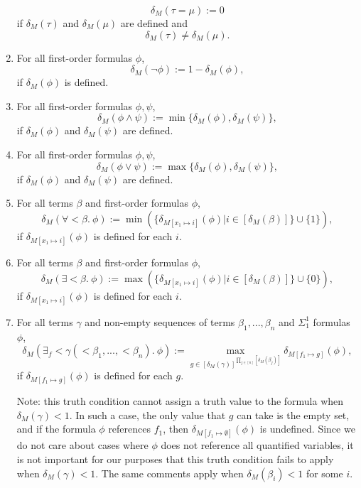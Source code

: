 \documentclass[11pt]{article}
\begin{document}
\begin{enumerate}
		\begin{equation}
			\delta_M(\tau = \mu) := 0
		\end{equation}
		if $\delta_M(\tau)$ and $\delta_M(\mu)$ are defined and 
		\begin{equation}
			\delta_M(\tau) \neq \delta_M(\mu).
		\end{equation}
	\item For all first-order formulas $\phi$,
		\begin{equation}
			\delta_M(\neg\phi) := 1 - \delta_M(\phi),
		\end{equation}
		if $\delta_M(\phi)$ is defined.
	\item For all first-order formulas $\phi, \psi$,
		\begin{equation}
			\delta_M(\phi \wedge \psi) := \min\{\delta_M(\phi), \delta_M(\psi)\},
		\end{equation}
		if $\delta_M(\phi)$ and $\delta_M(\psi)$ are defined.
	\item For all first-order formulas $\phi, \psi$,
		\begin{equation}
			\delta_M(\phi \vee \psi) := \max\{\delta_M(\phi), \delta_M(\psi)\},
		\end{equation}
		if $\delta_M(\phi)$ and $\delta_M(\psi)$ are defined.
	\item For all terms $\beta$ and first-order formulas $\phi$,
		\begin{equation}
			\delta_M(\forall < \beta.\ \phi) := \min(\{\delta_{M[x_1 \mapsto i]}(\phi) | i \in [\delta_M(\beta)]\} \cup \{1\}),
		\end{equation}
		if $\delta_{M[x_1 \mapsto i]}(\phi)$ is defined for each $i$.
	\item For all terms $\beta$ and first-order formulas $\phi$,
		\begin{equation}
			\delta_M(\exists < \beta.\ \phi) := \max(\{\delta_{M[x_1 \mapsto i]}(\phi) | i \in [\delta_M(\beta)]\} \cup \{0\}), 
		\end{equation}
		if $\delta_{M[x_1 \mapsto i]}(\phi)$ is defined for each $i$.
	\item For all terms $\gamma$ and non-empty sequences of terms $\beta_1, ..., \beta_n$ and $\Sigma^1_1$ formulas $\phi$,
		\begin{equation}
			\delta_M(\exists_f < \gamma(<\beta_1, ..., <\beta_n).\ \phi)
			:= \max_{g \in [\delta_M(\gamma)]^{\prod_{j \in [n]} [\delta_M(\beta_j)]}} \delta_{M[f_1 \mapsto g]}(\phi),
		\end{equation}
		if $\delta_{M[f_1 \mapsto g]}(\phi)$ is defined for each $g$.

		Note: this truth condition cannot assign a truth value to the formula when $\delta_M(\gamma) < 1$.
		In such a case, the only value that $g$ can take is the empty set, and
		if the formula $\phi$ references $f_1$, then $\delta_{M[f_1 \mapsto \emptyset]}(\phi)$
		is undefined. Since we do not care about cases where $\phi$ does not reference
		all quantified variables, it is not important for our purposes that this
		truth condition fails to apply when $\delta_M(\gamma) < 1$. The same comments
		apply when $\delta_M(\beta_i) < 1$ for some $i$.
\end{enumerate}
\end{document}
